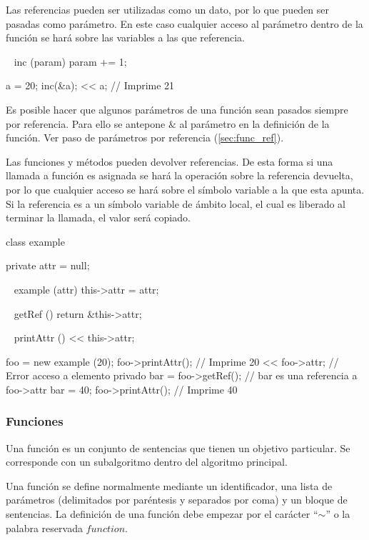 Las referencias pueden ser utilizadas como un dato, por lo que pueden ser pasadas como parámetro. En este caso cualquier acceso al parámetro dentro de la función 
se hará sobre las variables a las que referencia. \\

\begin{myverbatim}
   ~ inc (param) {
      param += 1;
   }
   
   a = 20;
   inc(&a);
   << a; // Imprime 21
\end{myverbatim}

Es posible hacer que algunos parámetros de una función sean pasados siempre por referencia. Para ello se antepone $\&$ al parámetro en la definición de
la función. Ver paso de parámetros por referencia (\autoref{sec:func_ref}).

Las funciones y métodos pueden devolver referencias. De esta forma si una llamada a función es asignada se hará la operación sobre la referencia devuelta, 
por lo que cualquier acceso se hará sobre el símbolo variable a la que esta apunta. Si la referencia es a un símbolo variable de ámbito local, el cual es liberado al terminar la llamada, 
el valor será copiado. \\

\begin{myverbatim}
   class example {
      private attr = null;
      
      ~ example (attr) {
         this->attr = attr;
      }
      
      ~ getRef () {
         return &this->attr;
      }
      
      ~ printAttr () {
         << this->attr;
      }
   }
   
   foo = new example (20);
   foo->printAttr(); // Imprime 20
   << foo->attr; // Error acceso a elemento privado
   bar = foo->getRef(); // bar es una referencia a foo->attr
   bar = 40; 
   foo->printAttr(); // Imprime 40
   
\end{myverbatim}

\subsubsection{Funciones} \label{sec:function}
Una función es un conjunto de sentencias que tienen un objetivo particular. Se corresponde con un
subalgoritmo dentro del algoritmo principal.

Una función se define normalmente mediante un identificador, una lista de parámetros (delimitados por paréntesis y separados por coma) y un bloque de sentencias. La
definición de una función debe empezar por el carácter ``$\sim$'' o la palabra reservada $function$. \\

